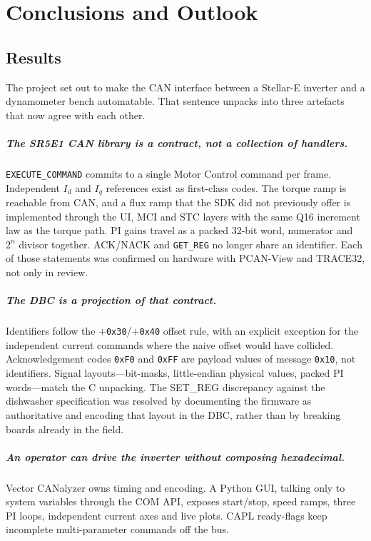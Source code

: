 \chapter{Conclusions and Outlook}
\label{ch:conc}

\section{Results}
The project set out to make the CAN interface between a Stellar-E inverter
and a dynamometer bench automatable. That sentence unpacks into three
artefacts that now agree with each other.

\paragraph{The SR5E1 CAN library is a contract, not a collection of
handlers.}
\texttt{EXECUTE\_COMMAND} commits to a single Motor Control command per
frame. Independent $I_d$ and $I_q$ references exist as first-class codes.
The torque ramp is reachable from CAN, and a flux ramp that the SDK did
not previously offer is implemented through the UI, MCI and STC layers
with the same Q16 increment law as the torque path. PI gains travel as a
packed 32-bit word, numerator and $2^n$ divisor together. ACK/NACK and
\texttt{GET\_REG} no longer share an identifier. Each of those statements
was confirmed on hardware with PCAN-View and TRACE32, not only in
review.

\paragraph{The DBC is a projection of that contract.}
Identifiers follow the $+$\texttt{0x30}/$+$\texttt{0x40} offset rule,
with an explicit exception for the independent current commands where
the naive offset would have collided. Acknowledgement codes
\texttt{0xF0} and \texttt{0xFF} are payload values of message
\texttt{0x10}, not identifiers. Signal layouts---bit-masks, little-endian
physical values, packed PI words---match the C unpacking. The
SET\_REG discrepancy against the dishwasher specification was resolved
by documenting the firmware as authoritative and encoding that layout
in the DBC, rather than by breaking boards already in the field.

\paragraph{An operator can drive the inverter without composing
hexadecimal.}
Vector CANalyzer owns timing and encoding. A Python GUI, talking only
to system variables through the COM API, exposes start/stop, speed
ramps, three PI loops, independent current axes and live plots. CAPL
ready-flags keep incomplete multi-parameter commands off the bus.

